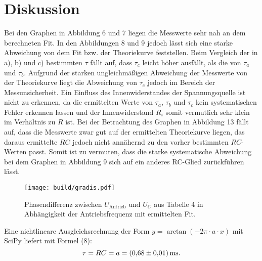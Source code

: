 \section{Diskussion}
\label{sec:Diskussion}\textbf{}
Bei den Graphen in Abbildung 6 und 7 liegen die Messwerte sehr nah an dem berechneten Fit. In den Abbildungen 8 und 9 jedoch lässt sich eine starke Abweichung von dem Fit bzw. der Theoriekurve feststellen. Beim Vergleich der in a), b) und c) bestimmten $\tau$ fällt auf, dass $\tau_c$ leicht höher ausfällt, als die von $\tau_a$ und $\tau_b$. Aufgrund der starken ungleichmäßigen Abweichung der Messwerte von der Theoriekurve liegt die Abweichung von $\tau_c$ jedoch im Bereich der Messunsicherheit. Ein Einfluss des Innenwiderstandes der Spannungsquelle ist nicht zu erkennen, da die ermittelten Werte von $\tau_a$, $\tau_b$ und $\tau_c$ kein systematischen Fehler erkennen lassen und der Innenwiderstand $R_i$ somit vermutlich sehr klein im Verhältnis zu $R$ ist. Bei der Betrachtung des Graphen in Abbildung 13 fällt auf, dass die Messwerte zwar gut auf der ermittelten Theoriekurve liegen, das daraus ermittelte $RC$ jedoch nicht annähernd zu den vorher bestimmten $RC$-Werten passt. Somit ist zu vermuten, dass die starke systematische Abweichung bei dem Graphen in Abbildung 9 sich auf ein anderes RC-Glied zurückführen lässt. 

\begin{figure}[H]
	\centering
	\caption{Phasendifferenz zwischen $U_{\text{Antrieb}}$ und $U_C$ aus Tabelle 4 in Abhängigkeit der Antriebsfrequenz mit ermittelten Fit.}
	\texttt{[image: build/gradis.pdf]}
	\label{fig:Dis}
\end{figure}
Eine nichtlineare Ausgleichsrechnung der Form $y = \arctan(-2\pi \cdot a \cdot x)$ mit SciPy \cite{scipy} liefert mit Formel (8):
\begin{displaymath}
\tau = RC = a = \SI{0.68 \pm 0.01}{\milli\second}\text{.}
\end{displaymath}






	
